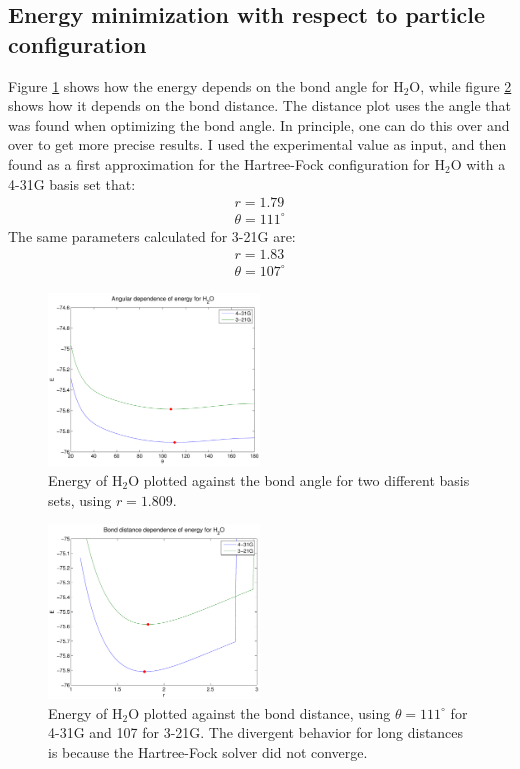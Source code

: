 \documentclass[a4paper,10pt, twocolumn, pre]{revtex4}
\begin{document}
\subsection{Energy minimization with respect to particle configuration}
Figure \ref{fig:eangularh2o} shows how the energy depends on the bond angle for H$_2$O, while figure \ref{fig:distanceh2o} shows how it depends on the bond distance. The distance plot uses the angle that was found when optimizing the bond angle. In principle, one can do this over and over to get more precise results. I used the experimental value as input, and then found as a first approximation for the Hartree-Fock configuration for H$_2$O with a 4-31G basis set that:
\begin{align}
r = 1.79 \\
\theta = 111^{\circ}
\end{align}
The same parameters calculated for 3-21G are:
\begin{align}
r =  1.83\\
\theta = 107^{\circ}
\end{align}
\begin{figure}
\includegraphics[width=0.5\textwidth]{figures/H2O_angular_energy.pdf}
\caption{Energy of H$_2$O plotted against the bond angle for two different basis sets, using $r=1.809$.}
\label{fig:eangularh2o}
\end{figure}

\begin{figure}
\includegraphics[width=0.5\textwidth]{figures/H2O_distance_energy.pdf}
\caption{Energy of H$_2$O plotted against the bond distance, using $\theta=111^\circ$ for 4-31G and 107 for 3-21G. The divergent behavior for long distances is because the Hartree-Fock solver did not converge.}
\label{fig:distanceh2o}
\end{figure}
\end{document}
